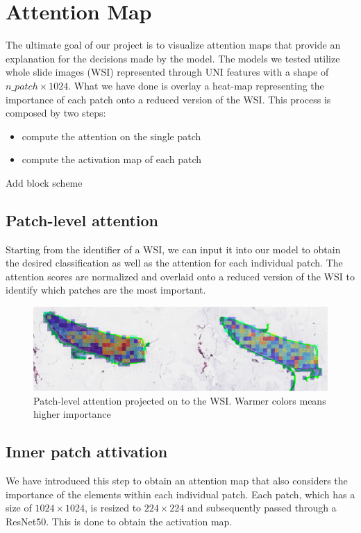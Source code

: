 \documentclass{article}
\begin{document}
\section{Attention Map} %
The ultimate goal of our project is to visualize attention maps that provide an explanation for the decisions made by the model. The models we tested utilize whole slide images (WSI) represented through UNI features with a shape of $n\_patch\times1024$. What we have done is overlay a heat-map representing the importance of each patch onto a reduced version of the WSI.
This process is composed by two steps:
\begin{itemize}
	\item compute the attention on the single patch
	\item compute the activation map of each patch
\end{itemize}

Add block scheme

\subsection{Patch-level attention}

Starting from the identifier of a WSI, we can input it into our model to obtain the desired classification as well as the attention for each individual patch. The attention scores are normalized and overlaid onto a reduced version of the WSI to identify which patches are the most important.

\begin{figure}[h]
	\centering
	\includegraphics[width=1\textwidth]{images/old_attention_map_val.png}
	\caption{Patch-level attention projected on to the WSI. Warmer colors means higher importance}
\end{figure}


\subsection{Inner patch attivation}
We have introduced this step to obtain an attention map that also considers the importance of the elements within each individual patch. Each patch, which has a size of $1024\times1024$, is resized to $224\times224$ and subsequently passed through a ResNet50. This is done to obtain the activation map.
\end{document}
